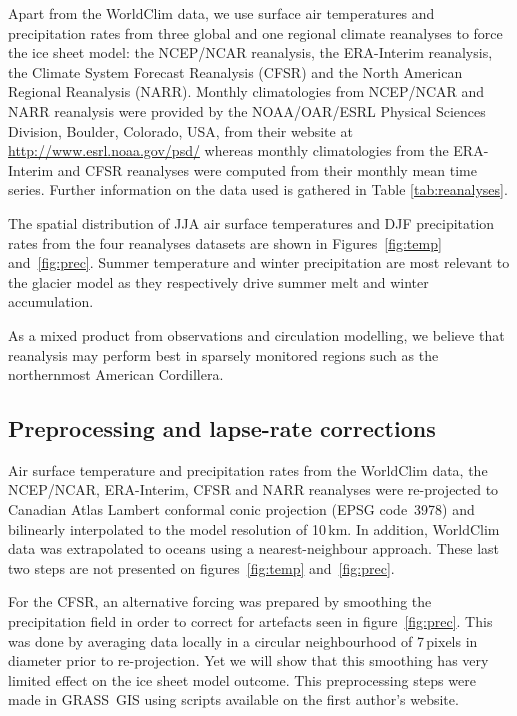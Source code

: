 Apart from the WorldClim data, we use surface air temperatures and precipitation rates from three global and one regional climate reanalyses to force the ice sheet model: the NCEP/NCAR reanalysis, the ERA-Interim reanalysis, the Climate System Forecast Reanalysis (CFSR) and the North American Regional Reanalysis (NARR). Monthly climatologies from NCEP/NCAR and NARR reanalysis were provided by the NOAA/OAR/ESRL Physical Sciences Division, Boulder, Colorado, USA, from their website at \url{http://www.esrl.noaa.gov/psd/} whereas monthly climatologies from the ERA-Interim and CFSR reanalyses were computed from their monthly mean time series. Further information on the data used is gathered in Table \ref{tab:reanalyses}.

The spatial distribution of JJA air surface temperatures and DJF precipitation rates from the four reanalyses datasets are shown in Figures~\ref{fig:temp} and~\ref{fig:prec}. Summer temperature and winter precipitation are most relevant to the glacier model as they respectively drive summer melt and winter accumulation.

As a mixed product from observations and circulation modelling, we believe that reanalysis may perform best in sparsely monitored regions such as the northernmost American Cordillera.


\subsection{Preprocessing and lapse-rate corrections}

Air surface temperature and precipitation rates  from the WorldClim data, the NCEP/NCAR, ERA-Interim, CFSR and NARR reanalyses were re-projected to Canadian Atlas Lambert conformal conic projection (EPSG code~3978)  and bilinearly interpolated to the model resolution of 10\,km. In addition, WorldClim data was extrapolated to oceans using a nearest-neighbour approach. These last two steps are not presented on figures~\ref{fig:temp} and~\ref{fig:prec}.

For the CFSR, an alternative forcing was prepared by smoothing the precipitation field in order to correct for artefacts seen in figure~\ref{fig:prec}. This was done by averaging data locally in a circular neighbourhood of 7\,pixels in diameter prior to re-projection. Yet we will show that this smoothing has very limited effect on the ice sheet model outcome. This preprocessing steps were made in GRASS~GIS using scripts available on the first author's website.

